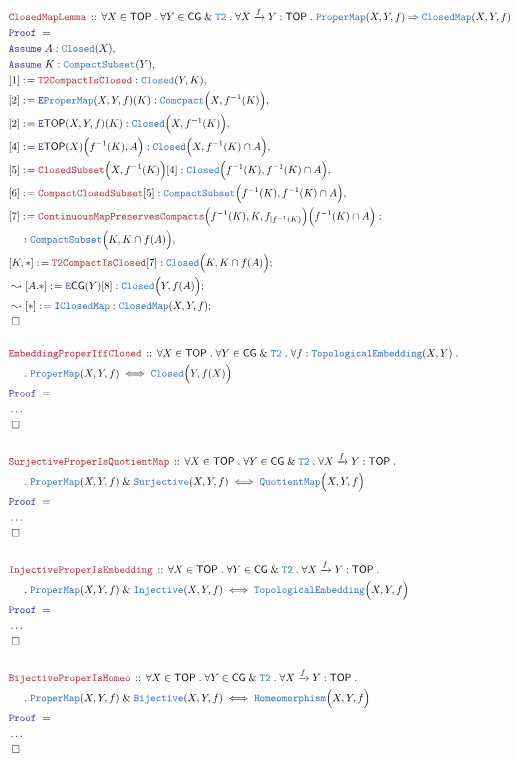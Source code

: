 \documentclass[12pt]{scrartcl}
\newcommand{\TYPE}[1]{\textcolor{NavyBlue}{\mathtt{#1}}}
\newcommand{\LOGIC}[1]{\textcolor{Blue}{\mathtt{#1}}}
\newcommand{\THM}[1]{\textcolor{Maroon}{\mathtt{#1}}}
\renewcommand{\.}{\; . \;}
\newcommand{\de}{: \kern 0.1pc =}
\newcommand{\Theorem}[2]{& \THM{#1} \, :: \, #2 \\ & \Proof = \\ }
\newcommand{\NewLine}{\\ & \kern 1pc}
\newcommand{\Page}[1]{ \begin{align*} #1 \end{align*}   }
\newcommand{\NoProof}{ & \ldots \\ \EndProof}
\renewcommand{\And}{\; \& \;}
\newcommand{\Imply}{\Rightarrow}
\newcommand{\Intro}{\LOGIC{I}}
\newcommand{\Elim}{\LOGIC{E}}
\newcommand{\Arrow}{\xrightarrow}
\newcommand{\Say}[3]{& #1 \de #2 : #3, \\}
\newcommand{\Conclude}[3]{& #1 \de #2 : #3; \\}
\newcommand{\DeriveConclude}[3]{& \leadsto #1 \de #2 : #3 ; \\}
\newcommand{\Assume}[2]{& \LOGIC{Assume} \; #1 : #2, \\}
\newcommand{\QED}{\; \square}
\newcommand{\EndProof}{& \QED \\}
\newcommand{\Proof}{\LOGIC{Proof} \; }
\newcommand{\TOP}{\mathsf{TOP}}
\newcommand{\CG}{\mathsf{CG}}
\begin{document}
\Page{
	\Theorem{ClosedMapLemma}
	{
		\forall X \in \TOP \.
		\forall Y \in \CG \And \TYPE{T2} \.
		\forall X \Arrow{f} Y : \TOP \. 
		\TYPE{ProperMap}(X,Y,f) \Imply \TYPE{ClosedMap}(X,Y,f)
	}
	\Assume{A}{\TYPE{Closed}(X)}
	\Assume{K}{\TYPE{CompactSubset}(Y)}
	\Say{[1]}{\THM{T2CompactIsClosed}}{\TYPE{Closed}(Y,K)}
	\Say{[2]}{\Elim \TYPE{ProperMap}(X,Y,f)(K) }
	{
		\TYPE{Comcpact}\Big( X,  f^{-1}(K) \Big) 
	}
	\Say{[2]}{\Elim \TOP(X,Y,f)(K) }
	{
		\TYPE{Closed}\Big( X,  f^{-1}(K) \Big) 
	}
	\Say{[4]}{\Elim \TOP(X)\Big( f^{-1}(K), A \Big)}
	{
		\TYPE{Closed}\Big(X, f^{-1}(K) \cap A \Big)
	}
	\Say{[5]}{\THM{ClosedSubset}\Big(X,f^{-1}(K) \Big)[4]}
	{
		\TYPE{Closed}\Big( f^{-1}(K), f^{-1}(K) \cap A \Big)
	}
	\Say{[6]}{\THM{CompactClosedSubset}[5]}
	{
		\TYPE{CompactSubset}\Big( f^{-1}(K), f^{-1}(K) \cap A \Big)
	}
	\Say{[7]}{
		\THM{ContinuousMapPreservesCompacts}
		\Big( f^{-1}(K),K,f_{|f^{-1}(K)}\Big)
		\Big( f^{-1}(K) \cap A  \Big)}
	{	
		\NewLine :
		\TYPE{CompactSubset}\Big(K, K \cap f(A) \Big)
	}
	\Conclude{[K,*]}
	{
		\THM{T2CompactIsClosed}[7]
	}
	{
		\TYPE{Closed}\Big( K, K \cap f(A) \Big)
	}
	\DeriveConclude{[A.*]}{\Elim \CG(Y)[8]}
	{
		\TYPE{Closed}\Big( Y, f(A) \Big)
	}
	\DeriveConclude{[*]}{\Intro \TYPE{ClosedMap}}
	{	
		\TYPE{ClosedMap}(X,Y,f)
	}
	\EndProof
	\\
	\Theorem{EmbeddingProperIffClosed}
	{
		\forall X \in \TOP \.
		\forall Y \in \CG \And \TYPE{T2} \.
		\forall f : \TYPE{TopologicalEmbedding}(X,Y) \. \NewLine \.
		\TYPE{ProperMap}(X,Y,f) \iff 
		\TYPE{Closed}\Big(Y,f(X)\Big)
	}
	\NoProof
	\\
	\Theorem{SurjectiveProperIsQuotientMap}
	{
		\forall X \in \TOP \.
		\forall Y \in \CG \And \TYPE{T2} \.
		\forall X \Arrow{f} Y : \TOP \. \NewLine \.
		\TYPE{ProperMap}(X,Y,f) \And \TYPE{Surjective}(X,Y,f) \iff 
		\TYPE{QuotientMap}\Big(X,Y,f\Big)
	}
	\NoProof
	\\
	\Theorem{InjectiveProperIsEmbedding}
	{
		\forall X \in \TOP \.
		\forall Y \in \CG \And \TYPE{T2} \.
		\forall X \Arrow{f} Y : \TOP \. \NewLine \. 
		\TYPE{ProperMap}(X,Y,f) \And \TYPE{Injective}(X,Y,f) \iff 
		\TYPE{TopologicalEmbedding}\Big(X,Y,f\Big)
	}
	\NoProof
	\\
	\Theorem{BijectiveProperIsHomeo}
	{
		\forall X \in \TOP \.
		\forall Y \in \CG \And \TYPE{T2} \.
		\forall X \Arrow{f} Y : \TOP \. \NewLine \.
		\TYPE{ProperMap}(X,Y,f) \And \TYPE{Bijective}(X,Y,f) \iff 
		\TYPE{Homeomorphism}\Big(X,Y,f\Big)
	}
	\NoProof
}
\newpage
\end{document}
